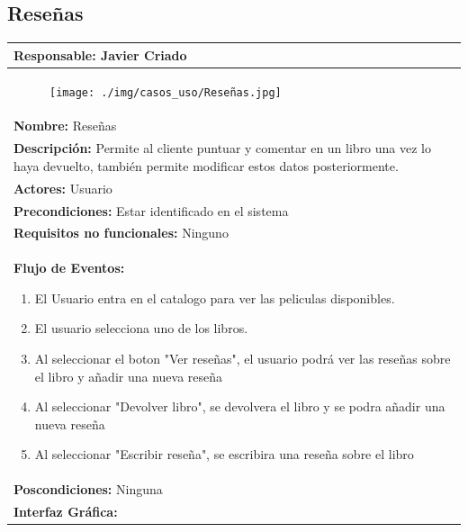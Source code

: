 \documentclass{report}
\begin{document}
        \subsection{Reseñas}
        \begin{center}
            \begin{longtable}{|p{\linewidth}|}
                \hline
                \textbf{Responsable:} Javier Criado\\
                \hline
                \begin{figure}[H]
                    \centering
                    \texttt{[image: ./img/casos\_uso/Reseñas.jpg]}
                \end{figure}\\
                \hline
                \textbf{Nombre:} Reseñas\\
                \hline
                \textbf{Descripción:} Permite al cliente puntuar y comentar en un libro una vez lo haya devuelto, también permite modificar estos datos posteriormente.\\
                \hline
                \textbf{Actores:} Usuario\\
                \hline
                \textbf{Precondiciones:} Estar identificado en el sistema\\
                \hline
                \textbf{Requisitos no funcionales:} Ninguno\\
                \hline
                \textbf{Flujo de Eventos:}
                \begin{enumerate}
                    \item El Usuario entra en el catalogo para ver las peliculas disponibles.
                    \item El usuario selecciona uno de los libros.
                    \item Al seleccionar el boton "Ver reseñas", el usuario podrá ver las reseñas sobre el libro y añadir una nueva reseña
                    \item Al seleccionar "Devolver libro", se devolvera el libro y se podra añadir una nueva reseña
                    \item Al seleccionar "Escribir reseña", se escribira una reseña sobre el libro  
                \end{enumerate}\\
                \hline
                \textbf{Poscondiciones:} Ninguna\\
                \hline
                \textbf{Interfaz Gráfica:}\\

\end{longtable}
\end{center}
\end{document}
